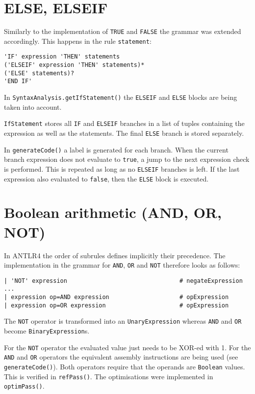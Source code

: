 \documentclass{guide}
\begin{document}
	\section{ELSE, ELSEIF}
	Similarly to the implementation of \texttt{TRUE} and \texttt{FALSE} the grammar
	was extended accordingly. This happens in the rule \texttt{statement}:

\begin{verbatim}
'IF' expression 'THEN' statements
('ELSEIF' expression 'THEN' statements)*
('ELSE' statements)?
'END IF'
\end{verbatim}

    In \texttt{SyntaxAnalysis.getIfStatement()} the \texttt{ELSEIF} and
    \texttt{ELSE} blocks are being taken into account.

    \texttt{IfStatement} stores all \texttt{IF} and \texttt{ELSEIF} branches in
    a list of tuples containing the expression as well as the statements. The
    final \texttt{ELSE} branch is stored separately.

    In \texttt{generateCode()} a label is generated for each branch. When the
    current branch expression does not evaluate to \texttt{true}, a jump to the
    next expression check is performed. This is repeated as long as no
    \texttt{ELSEIF} branches is left. If the last expression also evaluated to
    \texttt{false}, then the \texttt{ELSE} block is executed.

	\section{Boolean arithmetic (AND, OR, NOT)}
	In ANTLR4 the order of subrules defines implicitly their precedence. The
	implementation in the grammar for \texttt{AND}, \texttt{OR} and \texttt{NOT}
	therefore looks as follows:

\begin{verbatim}
| 'NOT' expression                                # negateExpression
...
| expression op=AND expression                    # opExpression
| expression op=OR expression                     # opExpression
\end{verbatim}
	
	The \texttt{NOT} operator is transformed into an \texttt{UnaryExpression}
	whereas \texttt{AND} and \texttt{OR} become \texttt{BinaryExpression}s.

	For the \texttt{NOT} operator the evaluated value just needs to be XOR-ed with
	1. For the \texttt{AND} and \texttt{OR} operators the equivalent assembly
	instructions are being used (see \texttt{generateCode()}). Both operators
	require that the operands are \texttt{Boolean} values. This is verified in
	\texttt{refPass()}. The optimisations were implemented in \texttt{optimPass()}.
\end{document}
